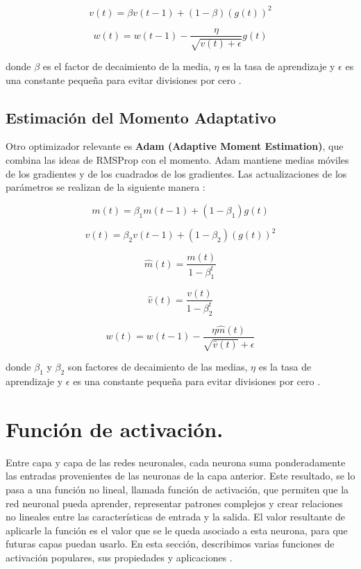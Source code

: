 \[
v(t) = \beta v(t-1) + (1-\beta) (g(t))^2
\]

\[
w(t) = w(t-1) - \frac{\eta}{\sqrt{v(t) + \epsilon}} g(t)
\]

donde \(\beta\) es el factor de decaimiento de la media, \(\eta\) es la tasa de aprendizaje y \(\epsilon\) es una constante pequeña para evitar divisiones por cero \citep{pajares2021aprendizaje}.




\subsection{Estimación del Momento Adaptativo}

Otro optimizador relevante es \textbf{Adam (Adaptive Moment Estimation)}, que combina las ideas de RMSProp con el momento. Adam mantiene medias móviles de los gradientes y de los cuadrados de los gradientes. Las actualizaciones de los parámetros se realizan de la siguiente manera \citep{pajares2021aprendizaje}:

\[
m(t) = \beta_1 m(t-1) + (1-\beta_1) g(t)
\]

\[
v(t) = \beta_2 v(t-1) + (1-\beta_2) (g(t))^2
\]

\[
\hat{m}(t) = \frac{m(t)}{1 - \beta_1^t}
\]

\[
\hat{v}(t) = \frac{v(t)}{1 - \beta_2^t}
\]

\[
w(t) = w(t-1) - \frac{\eta \hat{m}(t)}{\sqrt{\hat{v}(t)} + \epsilon}
\]

donde \(\beta_1\) y \(\beta_2\) son factores de decaimiento de las medias, \(\eta\) es la tasa de aprendizaje y \(\epsilon\) es una constante pequeña para evitar divisiones por cero \citep{pajares2021aprendizaje}.












\section{Función de activación.}

Entre capa y capa de las redes neuronales, cada neurona suma ponderadamente las entradas provenientes de las neuronas de la capa anterior. Este resultado, se lo pasa a una función no lineal, llamada función de activación, que permiten que la red neuronal pueda aprender, representar patrones complejos y crear relaciones no lineales entre las características de entrada y la salida. El valor resultante de aplicarle la función es el valor que se le queda asociado a esta neurona, para que futuras capas puedan usarlo. En esta sección, describimos varias funciones de activación populares, sus propiedades y aplicaciones \citep{pajares2021aprendizaje}.


